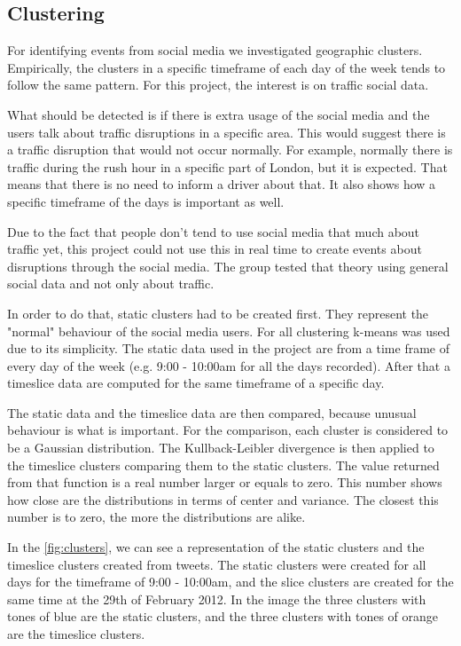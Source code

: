 \subsection{Clustering}

For identifying events from social media we investigated geographic clusters.
Empirically, the clusters in a specific timeframe of each day of
the week tends to follow the same pattern. For this project, the interest is on
traffic social data.

What should be detected is if there is extra usage of the social media and the users talk about
traffic disruptions in a specific area. This would suggest there is a traffic
disruption that would not occur normally. For example, normally there is traffic during
the rush hour in a specific part of London, but it is expected. That means that
there is no need to inform a driver about that. It also shows how a specific
timeframe of the days is important as well.

Due to the fact that people don't tend to use social media that much about
traffic yet, this project could not use this in real time to create events
about disruptions through the social media. The group
tested that theory using general social data and not only about traffic.

In order to do that, static clusters had to be created first.
They represent the "normal" behaviour of the social media users. For all clustering
k-means\cite{website:k-means} was used due to its simplicity. The static data used in the project are
from a time frame of every day of the week (e.g. 9:00 - 10:00am for all the
days recorded). After that a timeslice data are computed for the same timeframe
of a specific day.

The static data and the timeslice data are then compared, because unusual
behaviour is what is important. For the comparison, each cluster is considered
to be a Gaussian distribution\cite{website:gaussian}. The Kullback-Leibler
divergence\cite{Kullback} is then applied to the timeslice clusters comparing
them to the static clusters. The value returned from that function is a real
number larger or equals to zero. This number shows how close are the
distributions in terms of center and variance. The closest this number is to
zero, the more the distributions are alike.

In the \ref{fig:clusters}, we can see a representation of the static clusters and the
timeslice clusters created from tweets. The static clusters were created for
all days for the timeframe of 9:00 - 10:00am, and the slice clusters are
created for the same time at the 29th of February 2012. In the image the three
clusters with tones of blue are the static clusters, and the three clusters
with tones of orange are the timeslice clusters.

